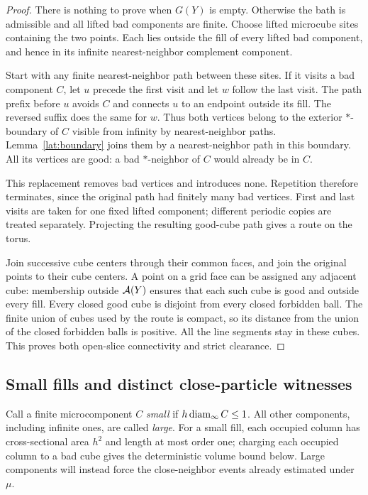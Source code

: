 \begin{proof}
There is nothing to prove when $G(Y)$ is empty. Otherwise the bath is
admissible and all lifted bad components are finite. Choose lifted microcube
sites containing the two points. Each lies outside the fill of every lifted bad component, and hence
in its infinite nearest-neighbor complement component.

Start with any finite nearest-neighbor path between these sites. If it
visits a bad component $C$, let $u$ precede the first visit and let $w$
follow the last visit. The path prefix before $u$ avoids $C$ and connects
$u$ to an endpoint outside its fill. The reversed suffix does the same for
$w$. Thus both vertices belong to the exterior $*$-boundary of $C$ visible
from infinity by nearest-neighbor paths. Lemma~\ref{lat:boundary} joins
them by a nearest-neighbor path in this boundary. All its vertices are
good: a bad $*$-neighbor of $C$ would already be in $C$.

This replacement removes bad vertices and introduces none. Repetition
therefore terminates, since the original path had finitely many bad
vertices. First and last visits are taken for one fixed lifted component;
different periodic copies are treated separately. Projecting the resulting
good-cube path gives a route on the torus.

Join successive cube centers through their common faces, and join the
original points to their cube centers. A point on a grid face can be
assigned any adjacent cube: membership outside $\mathcal A(Y)$ ensures that each
such cube is good and outside every fill. Every closed good cube is
disjoint from every closed forbidden ball. The finite union of cubes used
by the route is compact, so its distance from the union of the closed
forbidden balls is positive. All the line segments stay in these cubes. This proves both
open-slice connectivity and strict clearance.
\end{proof}

\subsection{Small fills and distinct close-particle witnesses}

Call a finite microcomponent $C$ \emph{small} if
$h\operatorname{diam}_\infty C\le1$. All other components, including infinite ones,
are called \emph{large}. For a small fill, each occupied column has
cross-sectional area $h^2$ and length at most order one; charging each
occupied column to a bad cube gives the deterministic volume bound below. Large
components will instead force the close-neighbor events already estimated
under $\mu$.

